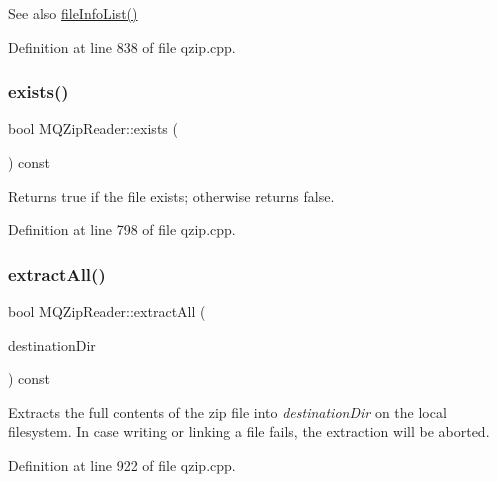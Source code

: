 \begin{DoxySeeAlso}{See also}
\hyperlink{class_m_q_zip_reader_a73e39077044aed4642ee02252cc08970}{file\+Info\+List()} 
\end{DoxySeeAlso}


Definition at line 838 of file qzip.\+cpp.

\mbox{\label{class_m_q_zip_reader_aa5e59037b1d83324f7f5d55d9289079a}} 
\subsubsection{\texorpdfstring{exists()}{exists()}}
{\footnotesize\ttfamily bool M\+Q\+Zip\+Reader\+::exists (\begin{DoxyParamCaption}{ }\end{DoxyParamCaption}) const}

Returns true if the file exists; otherwise returns false. 

Definition at line 798 of file qzip.\+cpp.

\mbox{\label{class_m_q_zip_reader_abe62477c78fb2964a80d502821608962}} 
\subsubsection{\texorpdfstring{extract\+All()}{extractAll()}}
{\footnotesize\ttfamily bool M\+Q\+Zip\+Reader\+::extract\+All (\begin{DoxyParamCaption}\item[{const Q\+String \&}]{destination\+Dir }\end{DoxyParamCaption}) const}

Extracts the full contents of the zip file into {\itshape destination\+Dir} on the local filesystem. In case writing or linking a file fails, the extraction will be aborted. 

Definition at line 922 of file qzip.\+cpp.

\mbox{\label{class_m_q_zip_reader_a6f6a36b121208a4fae0f17c9c4f3fd93}} 
